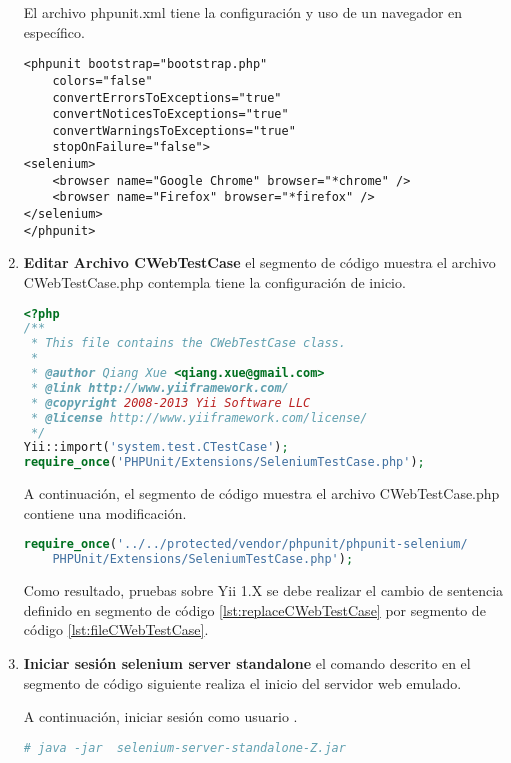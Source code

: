 \begin{enumerate}
El archivo phpunit.xml tiene la configuración y uso de un navegador en
específico.

\begin{lstlisting}[caption={Estrutura configuración archivo phpunit.xml.}]
<phpunit bootstrap="bootstrap.php"
	colors="false"
    convertErrorsToExceptions="true"
    convertNoticesToExceptions="true"
    convertWarningsToExceptions="true"
  	stopOnFailure="false">
<selenium>
	<browser name="Google Chrome" browser="*chrome" />
    <browser name="Firefox" browser="*firefox" />
</selenium>
</phpunit>
\end{lstlisting}

\item \textbf{Editar Archivo CWebTestCase} el segmento de código muestra
el archivo CWebTestCase.php contempla tiene la configuración de inicio.

\begin{lstlisting}[language=PHP, caption={Cabecera Archivo CWebTestCase}, label={lst:fileCWebTestCase}]
<?php
/**
 * This file contains the CWebTestCase class.
 *
 * @author Qiang Xue <qiang.xue@gmail.com>
 * @link http://www.yiiframework.com/
 * @copyright 2008-2013 Yii Software LLC
 * @license http://www.yiiframework.com/license/
 */
Yii::import('system.test.CTestCase');
require_once('PHPUnit/Extensions/SeleniumTestCase.php');
\end{lstlisting}

A continuación, el segmento de código muestra el archivo CWebTestCase.php
contiene una modificación. 

\begin{lstlisting}[language=PHP, caption={Instrucción a Reemplazar}, label={lst:replaceCWebTestCase}]
require_once('../../protected/vendor/phpunit/phpunit-selenium/
	PHPUnit/Extensions/SeleniumTestCase.php');
\end{lstlisting}

Como resultado, pruebas sobre Yii 1.X se debe realizar el cambio de sentencia
definido en segmento de código \ref{lst:replaceCWebTestCase} por segmento de
código \ref{lst:fileCWebTestCase}.


\item \textbf{Iniciar sesión selenium server standalone} el comando descrito
en el segmento de código siguiente realiza el inicio del servidor web emulado.

A continuación, iniciar sesión como usuario .

\begin{lstlisting}[language=bash, caption={Ejecución Servidor Server Standalone.}]
# java -jar  selenium-server-standalone-Z.jar
\end{lstlisting}



\end{enumerate}
